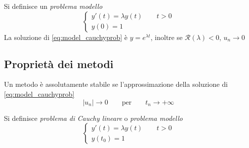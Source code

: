 Si definisce un \emph{problema modello}
\begin{equation}\label{eq:model_cauchyprob}
    \begin{cases} y'(t) = \lambda y(t) \qquad t>0 \\ y(0) = 1 \end{cases} \end{equation}
La soluzione di \ref{eq:model_cauchyprob} è $y = e^{ \lambda t}$, inoltre se $\mathcal{R}(\lambda)<0$, $u_n\rightarrow 0$

\subsection{Proprietà dei metodi}
\begin{definition} 
Un metodo è assolutamente stabile se l'approssimazione della soluzione di \ref{eq:model_cauchyprob}
\begin{equation} \label{eq:abs_stab}
    |u_n| \rightarrow 0 \qquad \text{per} \qquad t_n \rightarrow +\infty
\end{equation}
\end{definition}

Si definisce \emph{problema di Cauchy lineare} o \emph{problema modello}
\begin{equation}  \label{eq:cauchy_def}  \begin{cases}
y'(t) = \lambda y(t) \qquad  t > 0 \\
y(t_0) = 1 
\end{cases}
\end{equation}

